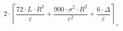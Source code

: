 \[2 \cdot \left\lceil \frac{72 \cdot L \cdot R^{2}}{\varepsilon} + \frac{900 \cdot \sigma^{2} \cdot R^{2}}{\varepsilon^{2}} + \frac{6 \cdot \Delta}{\varepsilon} \right\rceil_{+}\]
